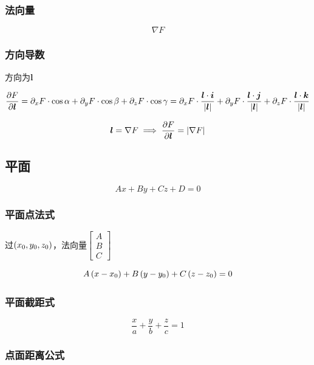 \documentclass{article}
\begin{document}
\subsubsection{法向量}

\[\nabla F\]

\subsubsection{方向导数}

方向为$\boldsymbol l$

\[\frac{\partial F}{\partial\boldsymbol l}
    =\partial_xF\cdot\cos\alpha+\partial_yF\cdot\cos\beta+\partial_zF\cdot\cos\gamma
    =\partial_xF\cdot\frac{\boldsymbol l\cdot\boldsymbol i}{\left|\boldsymbol l\right|}
    +\partial_yF\cdot\frac{\boldsymbol l\cdot\boldsymbol j}{\left|\boldsymbol l\right|}
    +\partial_zF\cdot\frac{\boldsymbol l\cdot\boldsymbol k}{\left|\boldsymbol l\right|}\]

\[\boldsymbol l=\nabla F\implies\frac{\partial F}{\partial\boldsymbol l}=\left|\nabla F\right|\]

\subsection{平面}

\begin{definition}[]
    \[Ax+By+Cz+D=0\]
\end{definition}

\subsubsection{平面点法式}

过$\left(x_0,y_0,z_0\right)$，法向量$\begin{bmatrix}A\\B\\C\end{bmatrix}$

\[A\left(x-x_0\right)+
    B\left(y-y_0\right)+
    C\left(z-z_0\right)=0\]

\subsubsection{平面截距式}

\[\frac xa+\frac yb+\frac zc=1\]

\subsubsection{点面距离公式}
\end{document}

